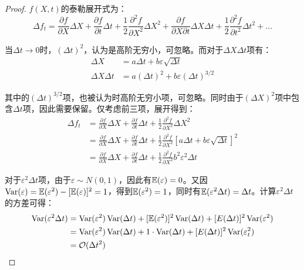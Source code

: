 \documentclass[11pt]{article}
\begin{document}
\begin{proof}
    $f(X,t)$的泰勒展开式为：
    \begin{equation*}
        \Delta f_t = \frac{\partial f}{\partial X} \Delta X + \frac{\partial f}{\partial t} \Delta t + \frac{1}{2} \frac{\partial^2 f}{\partial X^2}\Delta X^2  + \frac{\partial f}{\partial X \partial t}\Delta X \Delta t + \frac{1}{2} \frac{\partial^2 f}{\partial t^2} \Delta t^2 + \dots
    \end{equation*}

    当$\Delta t \rightarrow 0$时，$(\Delta t)^2$，认为是高阶无穷小，可忽略。而对于$\Delta X \Delta t$项有：
    \begin{align*}
        \Delta X &= a\Delta t + b \varepsilon\sqrt{\Delta t} \\
        \Delta X \Delta t &= a(\Delta t)^2 + b \varepsilon(\Delta t)^{3/2}
    \end{align*}

    其中的$(\Delta t)^{3/2}$项，也被认为时高阶无穷小项，可忽略。同时由于$(\Delta X)^2$项中包含$\Delta t$项，因此需要保留。仅考虑前三项，展开得到：
    \begin{align*}
        \Delta f_t & = \frac{\partial f}{\partial X} \Delta X + \frac{\partial f}{\partial t} \Delta t + \frac{1}{2} \frac{\partial^2 f}{\partial X^2}\Delta X^2 \\
        & = \frac{\partial f}{\partial X} \Delta X + \frac{\partial f}{\partial t} \Delta t + \frac{1}{2} \frac{\partial^2 f}{\partial X^2} [a\Delta t + b\varepsilon\sqrt{\Delta t}]^2 \\
        & = \frac{\partial f}{\partial X} \Delta X + \frac{\partial f}{\partial t} \Delta t + \frac{1}{2} \frac{\partial^2 f}{\partial X^2} b^2 \varepsilon^2 \Delta t
    \end{align*}

    对于$\varepsilon^2 \Delta t$项，由于$\varepsilon \sim N(0,1)$，因此有$\mathbb{E}(\varepsilon)=0$。又因$\operatorname{Var}(\varepsilon)=\mathbb{E}(\varepsilon^2)-[\mathbb{E}(\varepsilon)]^2=1$，得到$\mathbb{E}(\varepsilon^2)=1$，同时有$\mathbb{E}(\varepsilon^2 \Delta t) = \Delta t$。计算$\varepsilon^2 \Delta t$的方差可得：
    \begin{align*}
        \operatorname{Var}(\varepsilon^2 \Delta t) & = \operatorname{Var}(\varepsilon^2) \operatorname{Var}(\Delta t) + [\mathbb{E}(\varepsilon^2)]^2 \operatorname{Var}(\Delta t) + [E(\Delta t)]^2 \operatorname{Var}(\varepsilon^2) \\
        & = \operatorname{Var}(\varepsilon^2) \operatorname{Var}(\Delta t) + 1 \cdot \operatorname{Var}(\Delta t) + [E(\Delta t)]^2 \operatorname{Var}(\varepsilon_t^2) \\
        & = \mathcal{O}(\Delta t^2)
    \end{align*}


\end{proof}
\end{document}
